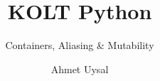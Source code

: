 
\usepackage{../KU-Beamer-Template/style/koc} 
\usepackage{minted}
\usepackage{upquote}
\usepackage{graphicx}
\usepackage{tikz}
\usetikzlibrary{shapes.symbols,positioning, chains}


    


        


\title{KOLT Python}
\subtitle{Containers, Aliasing \& Mutability} 
\date{}
\author{Ahmet Uysal}


